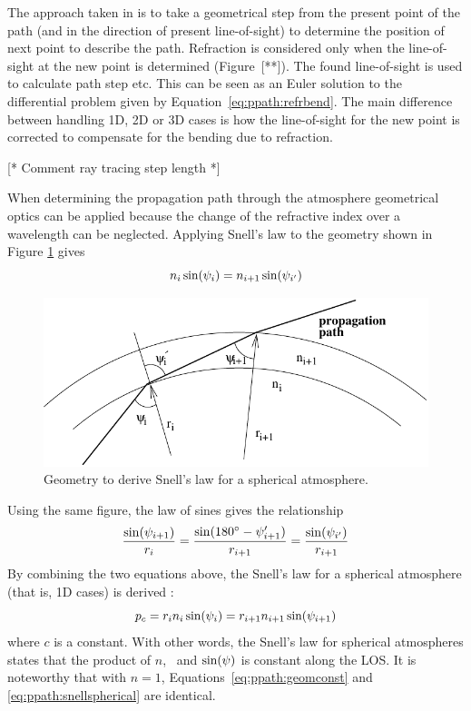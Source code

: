 The approach taken in  is to
take a geometrical step from the present point of the path (and in the
direction of present line-of-sight) to determine the position of next
point to describe the path. Refraction is considered only when the
line-of-sight at the new point is determined (Figure~[**]). The found
line-of-sight is used to calculate path step etc. This can be seen as
an Euler solution to the differential problem given by
Equation~\ref{eq:ppath:refrbend}. The main difference between handling
1D, 2D or 3D cases is how the line-of-sight for the new point is
corrected to compensate for the bending due to refraction.

[* Comment ray tracing step length *]


\label{sec:ppath:refr1D}
When determining the propagation path through the atmosphere
geometrical optics can be applied because the change of the refractive
index over a wavelength can be neglected. Applying Snell's law to the
geometry shown in Figure \ref{fig:ppath:snell} gives
\begin{equation}
  n_i \sin (\psi_{i}) = n_{i+1} \sin (\psi_{i'})
\end{equation}
\begin{figure}
  \begin{center}
    \includegraphics*{Figs/ppath/snell}
    \caption{Geometry to derive Snell's law for a spherical atmosphere. }
    \label{fig:ppath:snell} 
  \end{center} 
\end{figure}
Using the same figure, the law of sines gives the relationship
\begin{equation}
  \frac{\sin(\psi_{i+1})}{r_{i}} = 
  \frac{\sin(180^\circ-\psi_{i+1}')}{r_{i+1}} =
  \frac{\sin(\psi_{i'})}{r_{i+1}} 
\end{equation}
By combining the two equations above, the Snell's law for a spherical
atmosphere (that is, 1D cases) is derived
\citep[e.g.][]{kyle:91,balluch:97}:
\begin{equation}
  p_c = r_{i} n_i \sin(\psi_{i}) = r_{i+1} n_{i+1}\sin(\psi_{i+1}) 
 \label{eq:ppath:snellspherical}
\end{equation}
where $c$ is a constant. With other words, the Snell's law for
spherical atmospheres states that the product of $n$, \Rds\ and
$\sin(\psi)$ is constant along the LOS. It is noteworthy that with
$n=1$, Equations~\ref{eq:ppath:geomconst} and
\ref{eq:ppath:snellspherical} are identical.

